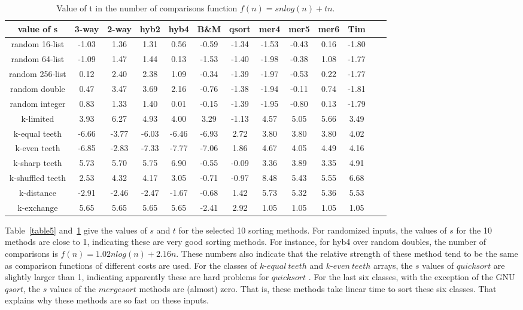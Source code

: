 \documentclass[AMA,STIX1COL]{WileyNJD-v2}
\newcommand{\keq}{$k$-$equal\ teeth$ }
\newcommand{\kev}{$k$-$even\ teeth$ }
\newcommand{\qusort}{$quicksort$ }
\newcommand{\qsortn}{$qsort$}
\newcommand{\msort}{$mergesort$ }
\begin{document}
\begin{table}
\caption{Value of t in the number of comparisons function $f(n) = snlog(n) + tn$.}
\centering
\begin{tabular}{|c|c|c|c|c|c|c|c|c|c|c|c|c|}
\toprule
value of s & 3-way & 2-way & hyb2 & hyb4 & B\&M& qsort & mer4 & mer5 & mer6 & Tim \\
\midrule
random 16-list	&-1.03	&1.36	&1.31	&0.56	&-0.59	&-1.34	&-1.53	&-0.43	&0.16&	-1.80\\
random 64-list&-1.09&	1.47&	1.44&	0.13&	-1.53&	-1.40&	-1.98&	-0.38&	1.08&	-1.77\\
random 256-list&0.12	&2.40	&2.38	&1.09	&-0.34	&-1.39	&-1.97	&-0.53	&0.22	&-1.77\\
random double&0.47&	 3.47&	 3.69& 	2.16&	-0.76	 &-1.38&	-1.94&	-0.11&	0.74&	-1.81\\
random integer&0.83& 	1.33&	1.40&	0.01&	-0.15&	-1.39&	-1.95&	-0.80&	0.13&	-1.79\\
k-limited&	3.93	&6.27	&4.93	&4.00	&3.29	&-1.13	&4.57	&5.05	&5.66	&3.49\\
k-equal teeth&	-6.66	& -3.77&	-6.03&	-6.46&	-6.93&	2.72&	3.80&	3.80&	3.80&	4.02\\
k-even teeth&	-6.85	& -2.83	 &-7.33	&-7.77	&-7.06	&1.86	&4.67	&4.05	&4.49	&4.16\\
k-sharp teeth&	5.73	&5.70&	5.75&	6.90&	-0.55&	-0.09&	3.36&	3.89&	3.35&	4.91\\
k-shuffled teeth&2.53	&4.32	&4.17	&3.05	&-0.71	&-0.97	&8.48	&5.43	&5.55	&6.68\\
k-distance&-2.91&	-2.46&	-2.47&	-1.67&	-0.68&	1.42&	5.73&	5.32&	5.36&	5.53\\
k-exchange&	5.65	&5.65	&5.65	&5.65	&-2.41	&2.92	&1.05	&1.05	&1.05	&1.05\\
\bottomrule
\end{tabular}
\label{table6}
\end{table}

Table~\ref{table5} and~\ref{table6} give the values of $s$ and $t$ for the selected 10 sorting methods. 
For randomized inputs, the values of $s$ for the 10 methods are close to 1, indicating these are very good sorting methods. 
For instance, for hyb4 over random doubles, the number of comparisons is $f(n) = 1.02nlog(n) + 2.16n$. 
These numbers also indicate that the relative strength of these method tend to be the same as comparison functions of different costs are used. 
For the classes of \keq and \kev arrays, the $s$ values of \qusort are slightly larger than 1, indicating apparently these are hard problems for \qusort. 
For the last six classes, with the exception of the GNU \qsortn, the $s$ values of the \msort methods are (almost) zero. 
That is, these methods take linear time to sort these six classes.  
That explains why these methods are so fast on these inputs.
\end{document}

